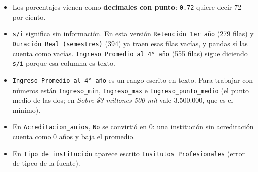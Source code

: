 \documentclass[10.5pt]{article}
\begin{document}
\begin{alertabox}
\begin{itemize}[leftmargin=1.1em,itemsep=2pt,topsep=2pt]
\item Los porcentajes vienen como \textbf{decimales con punto}: \texttt{0.72} quiere decir 72 por ciento.
\item \texttt{s/\allowbreak{}i} significa sin información. En esta versión \texttt{Retención 1er año} (279 filas) y \texttt{Duración Real (semestres)} (394) ya traen esas filas vacías, y pandas sí las cuenta como vacías. \texttt{Ingreso Promedio al 4° año} (555 filas) sigue diciendo \texttt{s/\allowbreak{}i} porque esa columna es texto.
\item \texttt{Ingreso Promedio al 4° año} es un rango escrito en texto. Para trabajar con números están \texttt{Ingreso\_\allowbreak{}min}, \texttt{Ingreso\_\allowbreak{}max} e \texttt{Ingreso\_\allowbreak{}punto\_\allowbreak{}medio} (el punto medio de las dos; en \emph{Sobre \$3 millones 500 mil} vale 3.500.000, que es el mínimo).
\item En \texttt{Acreditacion\_\allowbreak{}anios}, \texttt{No} se convirtió en 0: una institución sin acreditación cuenta como 0 años y baja el promedio.
\item En \texttt{Tipo de institución} aparece escrito \texttt{Insitutos Profesionales} (error de tipeo de la fuente).
\end{itemize}
\end{alertabox}

\newpage
{}\label{base2}\hypertarget{base2}{}
\end{document}
